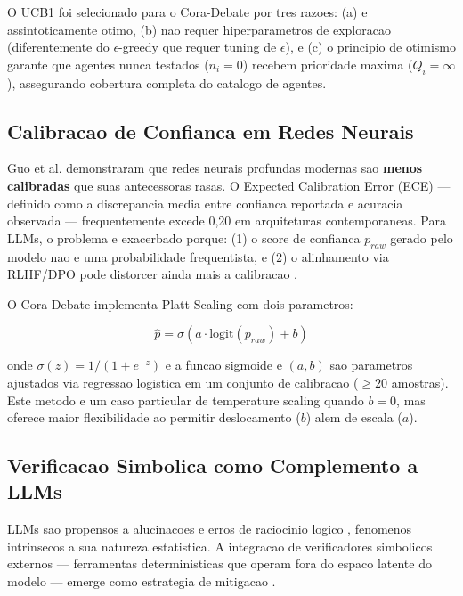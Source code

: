 \documentclass[5p]{elsarticle}
\begin{document}
O UCB1 foi selecionado para o Cora-Debate por tres razoes: (a) e assintoticamente otimo, (b) nao requer hiperparametros de exploracao (diferentemente do $\epsilon$-greedy que requer tuning de $\epsilon$), e (c) o principio de otimismo garante que agentes nunca testados ($n_i=0$) recebem prioridade maxima ($Q_i = \infty$), assegurando cobertura completa do catalogo de agentes.

\subsection{Calibracao de Confianca em Redes Neurais}

Guo et al. \cite{guo2017} demonstraram que redes neurais profundas modernas sao \textbf{menos calibradas} que suas antecessoras rasas. O Expected Calibration Error (ECE) --- definido como a discrepancia media entre confianca reportada e acuracia observada --- frequentemente excede 0,20 em arquiteturas contemporaneas. Para LLMs, o problema e exacerbado porque: (1) o score de confianca $p_{raw}$ gerado pelo modelo nao e uma probabilidade frequentista, e (2) o alinhamento via RLHF/DPO pode distorcer ainda mais a calibracao \cite{ouyang2022}.

O Cora-Debate implementa Platt Scaling \cite{platt1999} com dois parametros:

\begin{equation}\label{eq:platt}
  \hat{p} = \sigma(a \cdot \mathrm{logit}(p_{raw}) + b)
\end{equation}

onde $\sigma(z) = 1/(1 + e^{-z})$ e a funcao sigmoide e $(a, b)$ sao parametros ajustados via regressao logistica em um conjunto de calibracao ($\geq 20$ amostras). Este metodo e um caso particular de temperature scaling \cite{guo2017} quando $b = 0$, mas oferece maior flexibilidade ao permitir deslocamento ($b$) alem de escala ($a$).

\subsection{Verificacao Simbolica como Complemento a LLMs}

LLMs sao propensos a alucinacoes \cite{ji2023} e erros de raciocinio logico \cite{valmeekam2023}, fenomenos intrinsecos a sua natureza estatistica. A integracao de verificadores simbolicos externos --- ferramentas deterministicas que operam fora do espaco latente do modelo --- emerge como estrategia de mitigacao \cite{pan2023,gao2023}.
\end{document}
